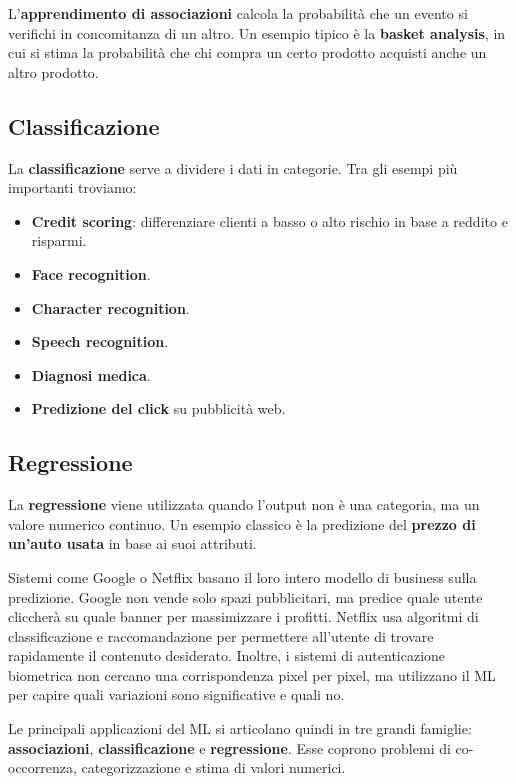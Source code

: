 L'\textbf{apprendimento di associazioni} calcola la probabilità che un evento si verifichi in concomitanza di un altro. Un esempio tipico è la \textbf{basket analysis}, in cui si stima la probabilità che chi compra un certo prodotto acquisti anche un altro prodotto.

\subsection{Classificazione}

La \textbf{classificazione} serve a dividere i dati in categorie. Tra gli esempi più importanti troviamo:
\begin{itemize}
    \item \textbf{Credit scoring}: differenziare clienti a basso o alto rischio in base a reddito e risparmi.
    \item \textbf{Face recognition}.
    \item \textbf{Character recognition}.
    \item \textbf{Speech recognition}.
    \item \textbf{Diagnosi medica}.
    \item \textbf{Predizione del click} su pubblicità web.
\end{itemize}

\subsection{Regressione}

La \textbf{regressione} viene utilizzata quando l'output non è una categoria, ma un valore numerico continuo. Un esempio classico è la predizione del \textbf{prezzo di un'auto usata} in base ai suoi attributi.

\begin{notaprof}
Sistemi come Google o Netflix basano il loro intero modello di business sulla predizione. Google non vende solo spazi pubblicitari, ma predice quale utente cliccherà su quale banner per massimizzare i profitti. Netflix usa algoritmi di classificazione e raccomandazione per permettere all'utente di trovare rapidamente il contenuto desiderato. Inoltre, i sistemi di autenticazione biometrica non cercano una corrispondenza pixel per pixel, ma utilizzano il ML per capire quali variazioni sono significative e quali no.
\end{notaprof}

Le principali applicazioni del ML si articolano quindi in tre grandi famiglie: \textbf{associazioni}, \textbf{classificazione} e \textbf{regressione}. Esse coprono problemi di co-occorrenza, categorizzazione e stima di valori numerici.

